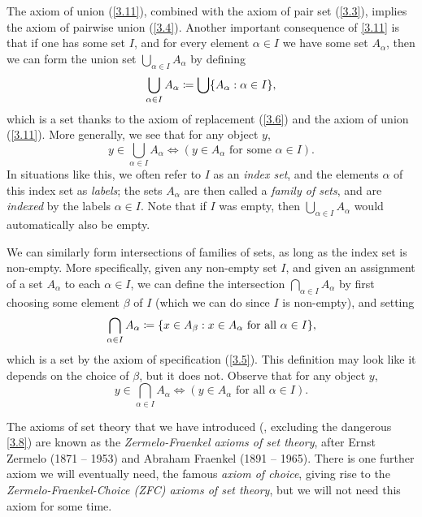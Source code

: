\begin{note}
  The axiom of union (\cref{3.11}), combined with the axiom of pair set (\cref{3.3}), implies the axiom of pairwise union (\cref{3.4}).
  Another important consequence of \cref{3.11} is that if one has some set \(I\), and for every element \(\alpha \in I\) we have some set \(A_{\alpha}\), then we can form the union set \(\bigcup_{\alpha \in I} A_{\alpha}\) by defining
  \[
    \bigcup_{\alpha \in I} A_{\alpha} \coloneqq \bigcup \set{A_{\alpha} : \alpha \in I},
  \]
  which is a set thanks to the axiom of replacement (\cref{3.6}) and the axiom of union (\cref{3.11}).
  More generally, we see that for any object \(y\),
  \[
    y \in \bigcup_{\alpha \in I} A_{\alpha} \iff (y \in A_{\alpha} \text{ for some } \alpha \in I).
  \]
  In situations like this, we often refer to \(I\) as an \emph{index set}, and the elements \(\alpha\) of this index set as \emph{labels};
  the sets \(A_{\alpha}\) are then called a \emph{family of sets}, and are \emph{indexed} by the labels \(\alpha \in I\).
  Note that if \(I\) was empty, then \(\bigcup_{\alpha \in I} A_{\alpha}\) would automatically also be empty.
\end{note}

\begin{note}
  We can similarly form intersections of families of sets, as long as the index set is non-empty.
  More specifically, given any non-empty set \(I\), and given an assignment of a set \(A_{\alpha}\) to each \(\alpha \in I\), we can define the intersection \(\bigcap_{\alpha \in I} A_{\alpha}\) by first choosing some element \(\beta\) of \(I\) (which we can do since \(I\) is non-empty), and setting
  \[
    \bigcap_{\alpha \in I} A_{\alpha} \coloneqq \set{x \in A_{\beta} : x \in A_{\alpha} \text{ for all } \alpha \in I},
  \]
  which is a set by the axiom of specification (\cref{3.5}).
  This definition may look like it depends on the choice of \(\beta\), but it does not.
  Observe that for any object \(y\),
  \[
    y \in \bigcap_{\alpha \in I} A_{\alpha} \iff (y \in A_{\alpha} \text{ for all } \alpha \in I).
  \]
\end{note}

\setcounter{thm}{11}
\begin{rmk}\label{3.4.12}
  The axioms of set theory that we have introduced (, excluding the dangerous \cref{3.8}) are known as the \emph{Zermelo-Fraenkel axioms of set theory}, after Ernst Zermelo (1871 -- 1953) and Abraham Fraenkel (1891 -- 1965).
  There is one further axiom we will eventually need, the famous \emph{axiom of choice}, giving rise to the \emph{Zermelo-Fraenkel-Choice (ZFC) axioms of set theory}, but we will not need this axiom for some time.
\end{rmk}

